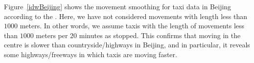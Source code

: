 \documentclass[article]{jss}
\begin{document}
  Figure~\ref{idwBeijing} shows the movement smoothing for taxi data in Beijing according to the . Here, we have not considered movements with length less than $1000$ meters. In other words, we assume taxis with the length of movements less than $1000$ meters per $20$ minutes as stopped. This confirms that moving in the centre is slower than countryside/highways in Beijing, and in particular, it reveals some highways/freeways in which taxis are moving faster.
\end{document}
